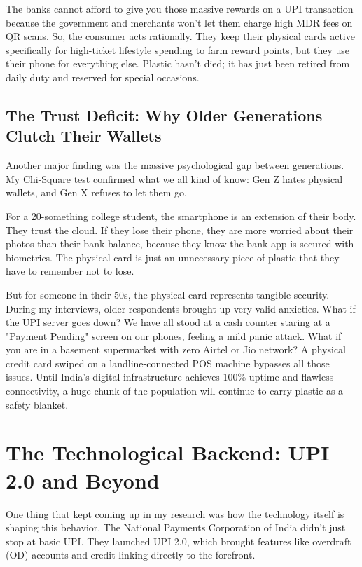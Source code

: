 The banks cannot afford to give you those massive rewards on a UPI transaction because the government and merchants won't let them charge high MDR fees on QR scans. So, the consumer acts rationally. They keep their physical cards active specifically for high-ticket lifestyle spending to farm reward points, but they use their phone for everything else. Plastic hasn't died; it has just been retired from daily duty and reserved for special occasions.

\subsection{The Trust Deficit: Why Older Generations Clutch Their Wallets}

Another major finding was the massive psychological gap between generations. My Chi-Square test confirmed what we all kind of know: Gen Z hates physical wallets, and Gen X refuses to let them go.

For a 20-something college student, the smartphone is an extension of their body. They trust the cloud. If they lose their phone, they are more worried about their photos than their bank balance, because they know the bank app is secured with biometrics. The physical card is just an unnecessary piece of plastic that they have to remember not to lose.

But for someone in their 50s, the physical card represents tangible security. During my interviews, older respondents brought up very valid anxieties. What if the UPI server goes down? We have all stood at a cash counter staring at a "Payment Pending" screen on our phones, feeling a mild panic attack. What if you are in a basement supermarket with zero Airtel or Jio network? A physical credit card swiped on a landline-connected POS machine bypasses all those issues. Until India's digital infrastructure achieves 100\% uptime and flawless connectivity, a huge chunk of the population will continue to carry plastic as a safety blanket.

\section{The Technological Backend: UPI 2.0 and Beyond}

One thing that kept coming up in my research was how the technology itself is shaping this behavior. The National Payments Corporation of India didn't just stop at basic UPI. They launched UPI 2.0, which brought features like overdraft (OD) accounts and credit linking directly to the forefront.

